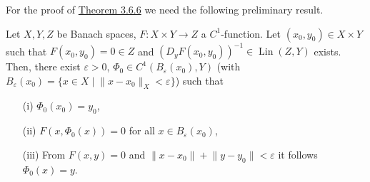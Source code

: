 For the proof of \hyperlink{theorem_3_6_6}{Theorem 3.6.6} we need the following preliminary result.\\

\begin{theorem}
Let $X,Y,Z$ be Banach spaces, $F:X\times Y\longrightarrow Z$ a $C^1$-function. Let $(x_0,y_0)\in X\times Y$ such that $F(x_0,y_0)=0\in Z$ and $(D_yF(x_0,y_0))^{-1}\in\operatorname{Lin}(Z,Y)$ exists. Then, there exist $\varepsilon>0$, $\Phi_0\in C^1(B_\varepsilon(x_0),Y)$ (with $B_\varepsilon(x_0)=\{x\in X\mid \lVert x-x_0\rVert_X<\varepsilon\}$) such that
\begin{itemize}
	\item[(i)] $\Phi_0(x_0)=y_0$,
	\item[(ii)] $F(x,\Phi_0(x))=0$ for all $x\in B_\varepsilon(x_0)$,
	\item[(iii)] From $F(x,y)=0$ and $\lVert x-x_0\rVert+\lVert y-y_0\rVert<\varepsilon$ it follows $\Phi_0(x)=y$.\\
\end{itemize}
\end{theorem}

